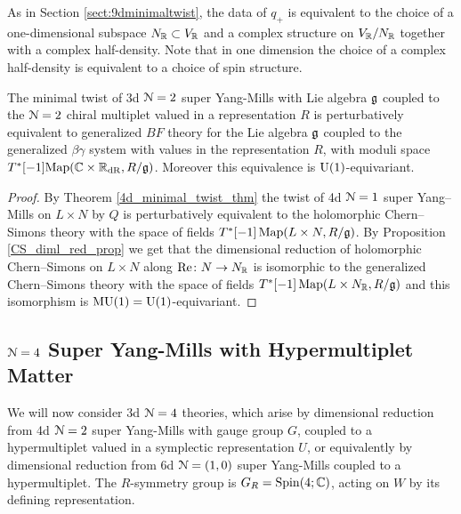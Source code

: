 \documentclass[10pt, oneside]{article}
\newcommand{\MU}{\mathrm{MU}}
\renewcommand{\Re}{\mathrm{Re}}
\begin{document}
As in Section \ref{sect:9dminimaltwist}, the data of $q_+$ is equivalent to the choice of a one-dimensional subspace $N_\mathbb R\subset V_\mathbb R$ and a complex structure on $V_\mathbb R/N_\mathbb R$ together with a complex half-density.  Note that in one dimension the choice of a complex half-density is equivalent to a choice of spin structure.

\begin{theorem} \label{3d_minimal_twist_thm}
The minimal twist of 3d $\mathcal N=2$ super Yang-Mills with Lie algebra $\mathfrak g$ coupled to the $\mathcal N=2$ chiral multiplet valued in a representation $R$ is perturbatively equivalent to generalized $BF$ theory for the Lie algebra $\mathfrak g$ coupled to the generalized $\beta\gamma$ system with values in the representation $R$, with moduli space $T^*[-1]\mathrm{Map}(\mathbb C \times \mathbb R_{\mathrm{dR}}, R/\mathfrak{g})$. Moreover this equivalence is $\mathrm{U}(1)$-equivariant.
\end{theorem}

\begin{proof}
By Theorem \ref{4d_minimal_twist_thm} the twist of 4d $\mathcal N=1$ super Yang--Mills on $L\times N$ by $Q$ is perturbatively equivalent to the holomorphic Chern--Simons theory with the space of fields $T^*[-1]\operatorname{Map}(L\times N, R / \mathfrak g)$. By Proposition \ref{CS_diml_red_prop} we get that the dimensional reduction of holomorphic Chern--Simons on $L\times N$ along $\Re\colon N\rightarrow N_\RR$ is isomorphic to the generalized Chern--Simons theory with the space of fields $T^*[-1]\operatorname{Map}(L\times N_\mathbb R, R/\mathfrak g)$ and this isomorphism is $\MU(1) = \mr U(1)$-equivariant.
\end{proof}

\subsection{\texorpdfstring{$\mathcal N = 4$}{N=4} Super Yang-Mills with Hypermultiplet Matter} \label{3d_4_section}
We will now consider 3d $\mathcal{N}=4$ theories, which arise by dimensional reduction from 4d $\mathcal{N}=2$ super Yang-Mills with gauge group $G$, coupled to a hypermultiplet valued in a symplectic representation $U$, or equivalently by dimensional reduction from 6d $\mathcal{N}=(1,0)$ super Yang-Mills coupled to a hypermultiplet.  The $R$-symmetry group is $G_R = \mathrm{Spin}(4;\mathbb C)$, acting on $W$ by its defining representation.

\vspace{-10pt}
\end{document}
